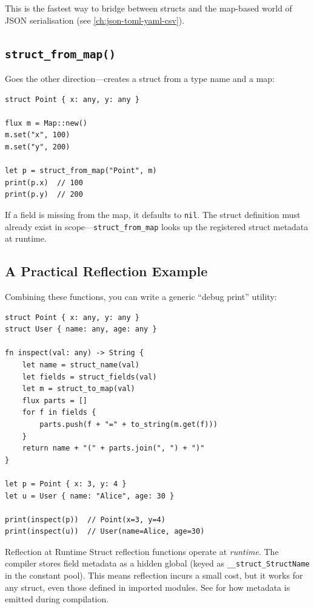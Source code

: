 This is the fastest way to bridge between structs and the map-based world
of JSON serialisation (see \cref{ch:json-toml-yaml-csv}).

\subsection{\texttt{struct\_from\_map()}}

Goes the other direction---creates a struct from a type name and a map:

\begin{lstlisting}[language=Lattice, caption={Creating a struct from a map}]
struct Point { x: any, y: any }

flux m = Map::new()
m.set("x", 100)
m.set("y", 200)

let p = struct_from_map("Point", m)
print(p.x)  // 100
print(p.y)  // 200
\end{lstlisting}

If a field is missing from the map, it defaults to \lstinline|nil|. The
struct definition must already exist in scope---\lstinline|struct_from_map|
looks up the registered struct metadata at runtime.

\subsection{A Practical Reflection Example}

Combining these functions, you can write a generic ``debug print'' utility:

\begin{lstlisting}[language=Lattice, caption={A generic struct inspector}]
struct Point { x: any, y: any }
struct User { name: any, age: any }

fn inspect(val: any) -> String {
    let name = struct_name(val)
    let fields = struct_fields(val)
    let m = struct_to_map(val)
    flux parts = []
    for f in fields {
        parts.push(f + "=" + to_string(m.get(f)))
    }
    return name + "(" + parts.join(", ") + ")"
}

let p = Point { x: 3, y: 4 }
let u = User { name: "Alice", age: 30 }

print(inspect(p))  // Point(x=3, y=4)
print(inspect(u))  // User(name=Alice, age=30)
\end{lstlisting}

\begin{notebox}{Reflection at Runtime}
Struct reflection functions operate at \emph{runtime}. The compiler stores
field metadata as a hidden global (keyed as \texttt{\_\_struct\_StructName}
in the constant pool). This means reflection incurs a small cost, but it
works for any struct, even those defined in imported modules. See
 for how metadata is emitted during
compilation.
\end{notebox}


